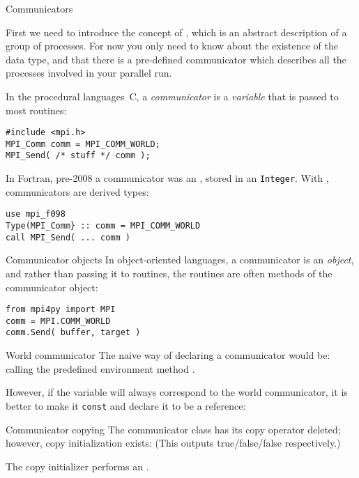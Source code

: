  {Communicators}

First we need to introduce the concept of
, which is an abstract description of a
group of processes. For now you only need to know about the existence
of the  data type, and that there is a
pre-defined communicator  which
describes all the processes involved in your parallel run.


In the procedural languages~C,
a \emph{communicator} is a \emph{variable}
that is passed to most routines:
\begin{lstlisting}
#include <mpi.h>
MPI_Comm comm = MPI_COMM_WORLD;
MPI_Send( /* stuff */ comm );
\end{lstlisting}

\begin{fortrannote}
  In Fortran, pre-2008 a communicator was an ,
  stored in an \lstinline{Integer}. With ,
  communicators are derived types:
\begin{lstlisting}
use mpi_f098
Type(MPI_Comm} :: comm = MPI_COMM_WORLD
call MPI_Send( ... comm )
\end{lstlisting}
\end{fortrannote}

\begin{pythonnote}{Communicator objects}
In object-oriented languages, a communicator is an
\emph{object},
and rather than passing it to routines,
the routines are often methods of the communicator object:
\begin{lstlisting}
from mpi4py import MPI
comm = MPI.COMM_WORLD
comm.Send( buffer, target )
\end{lstlisting}
\end{pythonnote}

\begin{mplnote}{World communicator}
  The naive way of declaring a communicator would be:
  calling the predefined environment method .

  However, if the variable will always correspond to the world communicator,
  it is better to make it \lstinline{const} and declare it to be a reference:
\end{mplnote}

\begin{mplnote}{Communicator copying}
  The communicator class has its copy operator deleted;
  however, copy initialization exists:
  (This outputs true/false/false respectively.)

  \begin{mplimpl}
    The copy initializer performs an .
  \end{mplimpl}
\end{mplnote}

